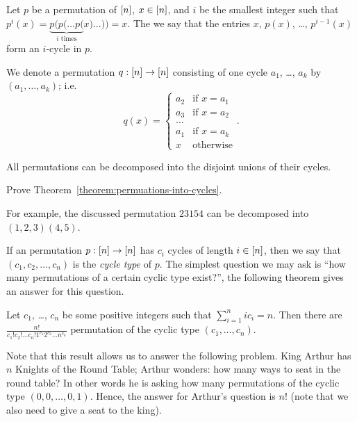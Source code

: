 \begin{definition}
  Let $p$ be a permutation of ${[{n}]}$, $x \in {[{n}]}$, and $i$ be the smallest
  integer such that
  $p^i(x) = \underbrace{p(p(\dots p(}_{i \text{ times}} x) \dots )) = x$.
  The we say that the entries $x$, $p(x)$, \dots, $p^{i - 1}(x)$ form an
  $i$-cycle in $p$.

  We denote a permutation $q : {[{n}]} \to {[{n}]}$ consisting of one cycle
  $a_1$, \dots, $a_k$ by $(a_1, \dots, a_k)$; i.e.
  \[
    q(x) =
    \begin{cases}
      a_2 & \text{if } x = a_1 \\
      a_3 & \text{if } x = a_2 \\
      \dots \\
      a_1 & \text{if } x = a_k \\
      x & \text{otherwise}
    \end{cases}.
  \]
\end{definition}

\begin{theorem}
\label{theorem:permuations-into-cycles}
  All permutations can be decomposed into the disjoint unions of their cycles.
\end{theorem}
\begin{exercise}
  Prove Theorem~\ref{theorem:permuations-into-cycles}.
\end{exercise}
For example, the discussed permutation $2 3 1 5 4$ can be decomposed into
$(1, 2, 3) (4, 5)$.

If an permutation $p : {[{n}]} \to {[{n}]}$ has $c_i$ cycles of length $i \in {[{n}]}$, then
we say that $(c_1, c_2, \dots, c_n)$ is the \emph{cycle type} of $p$.
The simplest question we may ask is ``how many permutations of a certain cyclic
type exist?'', the following theorem gives an answer for this question.
\begin{theorem}
  Let $c_1$, \dots, $c_n$ be some positive integers such that
  $\sum_{i = 1}^n i c_i = n$. Then there are
  $\frac{n!}{c_1! c_2! \dots c_n! 1^{c_1} 2^{c_2} \dots n^{c_n}}$
  permutation of the cyclic type $(c_1, \dots, c_n)$.
\end{theorem}

Note that this result allows us to answer the following problem. King Arthur has
$n$ Knights of the Round Table; Arthur wonders: how many ways to seat in the
round table? In other words he is asking how many permutations of the cyclic
type $(0, 0, \dots, 0, 1)$. Hence, the answer for Arthur's question is $n!$
(note that we also need to give a seat to the king).

